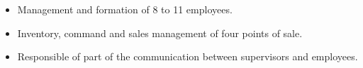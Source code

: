 \documentclass{res}
\begin{document}
\begin{resume}
{	\vspace{0.05in}
	\begin{itemize} \itemsep -2pt
		\item Management and formation of 8 to 11 employees.
		\item Inventory, command and sales management of four points of sale.
		\item Responsible of part of the communication between supervisors and employees.
	\end{itemize}



}

\vspace{0.1in}

\end{resume}
\end{document}
